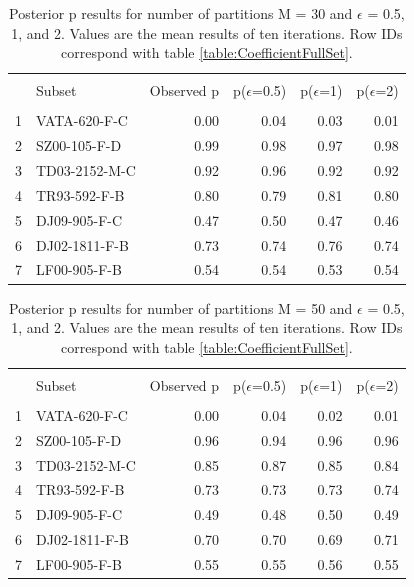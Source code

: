 \documentclass[10pt, letterpaper]{article}
\begin{document}
\begin{spacing}{1.0}
\begin{table}[h]
    \centering
    \caption{Posterior p results for number of partitions M = 30 and $\epsilon$ = 0.5, 1, and 2.  Values are the mean results of ten iterations.  Row IDs correspond with table \ref{table:CoefficientFullSet}.}
    \begin{tabular}{rlrrrr}
        \hline\\[-10pt]
        & Subset & Observed p & p($\epsilon$=0.5) & p($\epsilon$=1) & p($\epsilon$=2) \\ 
        \hline\\[-6pt]
        1 & VATA-620-F-C & 0.00 & 0.04 & 0.03 & 0.01 \\ 
        2 & SZ00-105-F-D & 0.99 & 0.98 & 0.97 & 0.98 \\ 
        3 & TD03-2152-M-C & 0.92 & 0.96 & 0.92 & 0.92 \\ 
        4 & TR93-592-F-B & 0.80 & 0.79 & 0.81 & 0.80 \\ 
        5 & DJ09-905-F-C & 0.47 & 0.50 & 0.47 & 0.46 \\ 
        6 & DJ02-1811-F-B & 0.73 & 0.74 & 0.76 & 0.74 \\ 
        7 & LF00-905-F-B & 0.54 & 0.54 & 0.53 & 0.54 \\ 
        \hline
    \end{tabular}
    \label{table:Coefficient-M=30}
\end{table}

\begin{table}[ht]
    \centering
    \caption{Posterior p results for number of partitions M = 50 and $\epsilon$ = 0.5, 1, and 2.  Values are the mean results of ten iterations.  Row IDs correspond with table \ref{table:CoefficientFullSet}.}
    \begin{tabular}{rlrrrr}
        \hline\\[-10pt]
        & Subset & Observed p & p($\epsilon$=0.5) & p($\epsilon$=1) & p($\epsilon$=2) \\ 
        \hline\\[-6pt]
        1 & VATA-620-F-C & 0.00 & 0.04 & 0.02 & 0.01 \\ 
        2 & SZ00-105-F-D & 0.96 & 0.94 & 0.96 & 0.96 \\ 
        3 & TD03-2152-M-C & 0.85 & 0.87 & 0.85 & 0.84 \\ 
        4 & TR93-592-F-B & 0.73 & 0.73 & 0.73 & 0.74 \\ 
        5 & DJ09-905-F-C & 0.49 & 0.48 & 0.50 & 0.49 \\ 
        6 & DJ02-1811-F-B & 0.70 & 0.70 & 0.69 & 0.71 \\ 
        7 & LF00-905-F-B & 0.55 & 0.55 & 0.56 & 0.55 \\  
        \hline
    \end{tabular}
    \label{table:Coefficient-M=50}
\end{table}


\end{spacing}
\end{document}
